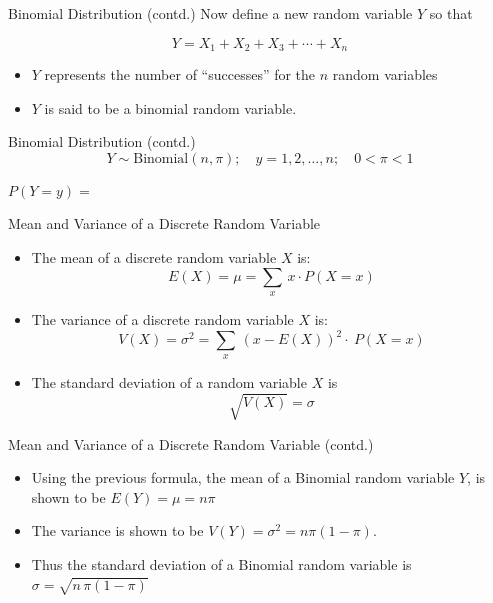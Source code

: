 \documentclass[
  ignorenonframetext,
]{beamer}
\providecommand{\tightlist}{%
  \setlength{\itemsep}{0pt}\setlength{\parskip}{0pt}}
\begin{document}
\begin{frame}{Binomial Distribution (contd.)}
\protect{}\label{binomial-distribution-contd.}
Now define a new random variable \(Y\) so that

\[Y = X_1 + X_2 + X_3 + \cdots + X_n\]

\begin{itemize}
\tightlist
\item
  \(Y\) represents the number of ``successes'' for the \(n\) random
  variables
\item
  \(Y\) is said to be a binomial random variable.
\end{itemize}
\end{frame}

\begin{frame}{Binomial Distribution (contd.)}
\protect{}\label{binomial-distribution-contd.-1}
\[
Y\sim \text{Binomial}(n,\pi);\quad y=1,2,\dots,n; \quad 0\lt \pi\lt 1
\]

\hfill\break
\hfill\break
\hfill\break

\(P(Y=y)=\)
\end{frame}

\begin{frame}{Mean and Variance of a Discrete Random Variable}
\protect{}\label{mean-and-variance-of-a-discrete-random-variable}
\begin{itemize}
\item
  The {mean} of a discrete random variable \(X\) is:
  \[E(X) = \mu = \sum_x\,x \cdot P(X=x)\]
\item
  The {variance} of a discrete random variable \(X\) is:
  \[V(X) = \sigma^2= \sum_x\,(x - E(X))^2\cdot \ P(X=x)\]
\item
  The {standard deviation} of a random variable \(X\) is
  \[\sqrt{V(X)}=\sigma\]
\end{itemize}
\end{frame}

\begin{frame}{Mean and Variance of a Discrete Random Variable (contd.)}
\protect{}\label{mean-and-variance-of-a-discrete-random-variable-contd.}
\begin{itemize}
\item
  Using the previous formula, the {mean} of a Binomial random variable
  \(Y\), is shown to be \(E(Y)=\mu = n \pi\)
\item
  The {variance} is shown to be \(V(Y) =\sigma^2= n\pi(1 - \pi)\).
\item
  Thus the {standard deviation} of a Binomial random variable is
  \(\sigma= \sqrt{n\,\pi(1 - \pi)}\)
\end{itemize}
\end{frame}
\end{document}
